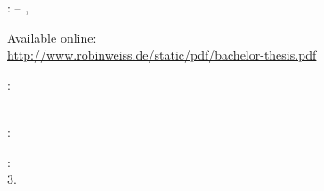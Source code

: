 \thispagestyle{empty}

\hfill

\vfill

\noindent\myName: \textit{\myTitle} -- \mySubtitle,
\textcopyright\ \myTime

\medskip

\noindent
Available online: \\
\url{http://www.robinweiss.de/static/pdf/bachelor-thesis.pdf}

\bigskip

\noindent{}: \\
\myProf \\
\mySupervisor

\medskip

\noindent{}: \\
\myLocation

\medskip

\noindent{}: \\
3. \myTime